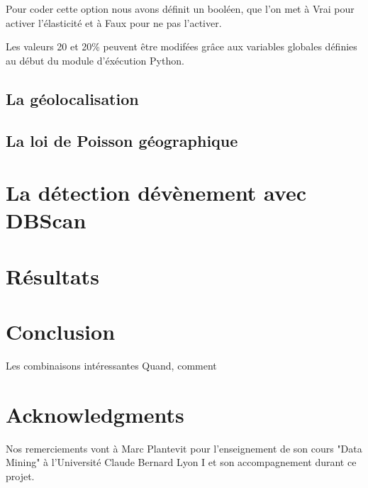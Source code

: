 \documentclass[12pt]{article}
\begin{document}
Pour coder cette option nous avons d\'efinit un bool\'een, que l'on met \`a Vrai pour activer
l'\'elasticit\'e et \`a Faux pour ne pas l'activer.

Les valeurs 20 et 20\% peuvent \^etre modif\'ees gr\^ace aux variables globales d\'efinies au d\'ebut du
module d'\'ex\'ecution Python.

\subsection{La g\'eolocalisation}


\subsection{La loi de Poisson g\'eographique}


\section{La d\'etection d\'ev\`enement avec DBScan}


\section{R\'esultats}



\section{Conclusion}
Les combinaisons int\'eressantes
\newline
Quand, comment


\section*{Acknowledgments}
Nos remerciements vont \`a Marc Plantevit pour l'enseignement de son cours "Data Mining" \`a l'Universit\'e Claude Bernard Lyon I et son accompagnement durant ce projet.






\appendix
\end{document}
